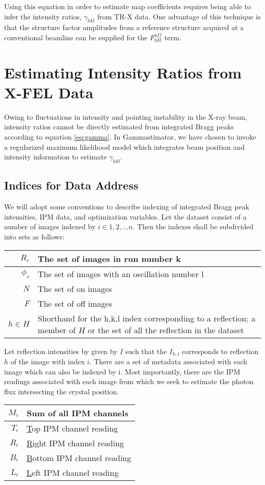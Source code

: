 \documentclass{report}
\begin{document}
Using this equation in order to estimate map coefficients requires being able to infer the intensity ratios, $\gamma_{hkl}$ from TR-X data. One advantage of this technique is that the structure factor amplitudes from a reference structure acquired at a conventional beamline can be supplied for the $F^{off}_{hkl}$ term. 

\section{Estimating Intensity Ratios from X-FEL Data}
Owing to fluctuations in intensity and pointing instability in the X-ray beam, intensity ratios cannot be directly estimated from integrated Bragg peaks according to equation \ref{eq:gamma}. 
In Gammastimator, we have chosen to invoke a regularized maximum likelihood model which integrates beam position and intensity information to estimate $\gamma_{hkl}$. 

\subsection{Indices for Data Address}
We will adopt some conventions to describe indexing of integrated Bragg peak intensities, IPM data, and optimization variables.
Let the dataset consist of a number of images indexed by $i\in {1, 2, ... n}$.
Then the indexes shall be subdivided into sets as follows:
\break


\begin{center}
\begin{tabular}{r | p{}}
$R_r$ & The set of images in run number k \\ \hline
$\phi_s$ & The set of images with an oscillation number l \\ \hline
$N$ & The set of on images \\ \hline
$F$ & The set of off images \\ \hline
$h\in H$ & Shorthand for the h,k,l index corresponding to a reflection; a member of $H$ or the set of all the reflection in the dataset
\end{tabular} 
\end{center}


Let reflection intensities by given by $I$ such that the $I_{h,i}$ corresponds to reflection $h$ of the image with index $i$. 
There are a set of metadata associated with each image which can also be indexed by i. 
Most importantly, there are the IPM readings associated with each image from which we seek to estimate the photon flux intersecting the crystal position.  
\break
\begin{center}
\begin{tabular}{r | l}
$M_i$ & Sum of all IPM channels\\ \hline
$T_i$ & \underline{T}op    IPM channel reading\\ \hline
$R_i$ & \underline{R}ight  IPM channel reading\\ \hline
$B_i$ & \underline{B}ottom IPM channel reading\\ \hline
$L_i$ & \underline{L}eft   IPM channel reading\\ 
\end{tabular}
\end{center}
\end{document}
